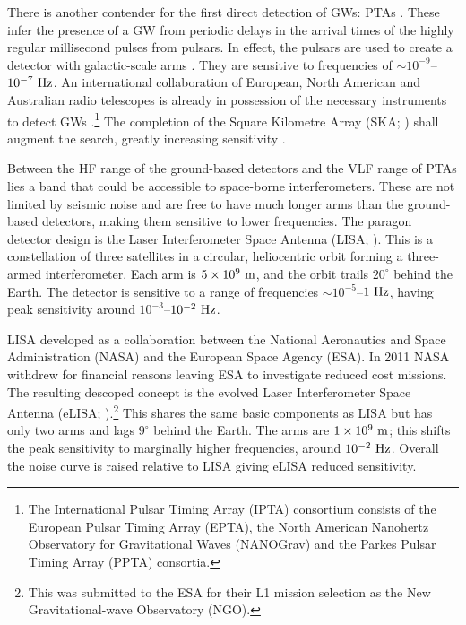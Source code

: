 There is another contender for the first direct detection of GWs: PTAs \citep{McWilliams2012,Sesana2012a}. These infer the presence of a GW from periodic delays in the arrival times of the highly regular millisecond pulses from pulsars. In effect, the pulsars are used to create a detector with galactic-scale arms \citep{Hellings1983}. They are sensitive to frequencies of $\sim10^{-9}$--$10^{-7}~\mathrm{Hz}$. An international collaboration of European, North American and Australian radio telescopes is already in possession of the necessary instruments to detect GWs \citep{Hobbs2010}.\footnote{The International Pulsar Timing Array (IPTA) consortium consists of the European Pulsar Timing Array (EPTA), the North American Nanohertz Observatory for Gravitational Waves (NANOGrav) and the Parkes Pulsar Timing Array (PPTA) consortia.} The completion of the Square Kilometre Array (SKA; \citealt{Dewdney2009}) shall augment the search, greatly increasing sensitivity \citep{Kramer2004}.

Between the HF range of the ground-based detectors and the VLF range of PTAs lies a band that could be accessible to space-borne interferometers. These are not limited by seismic noise and are free to have much longer arms than the ground-based detectors, making them sensitive to lower frequencies. The paragon detector design is the Laser Interferometer Space Antenna (LISA; \citealt{Bender1998, Danzmann2003}). This is a constellation of three satellites in a circular, heliocentric orbit forming a three-armed interferometer. Each arm is $5 \times 10^9~\mathrm{m}$, and the orbit trails $20^{\circ}$ behind the Earth. The detector is sensitive to a range of frequencies $\sim10^{-5}$--$1~\mathrm{Hz}$, having peak sensitivity around $10^{-3}$--$10^{-2}~\mathrm{Hz}$.

LISA developed as a collaboration between the National Aeronautics and Space Administration (NASA) and the European Space Agency (ESA). In 2011 NASA withdrew for financial reasons leaving ESA to investigate reduced cost missions. The resulting descoped concept is the evolved Laser Interferometer Space Antenna (eLISA; \citealt{Jennrich2011, Amaro-Seoane2012a}).\footnote{This was submitted to the ESA for their L1 mission selection as the New Gravitational-wave Observatory (NGO).} This shares the same basic components as LISA but has only two arms and lags $9^{\circ}$ behind the Earth. The arms are $1 \times 10^9~\mathrm{m}$; this shifts the peak sensitivity to marginally higher frequencies, around $10^{-2}~\mathrm{Hz}$. Overall the noise curve is raised relative to LISA giving eLISA reduced sensitivity.


